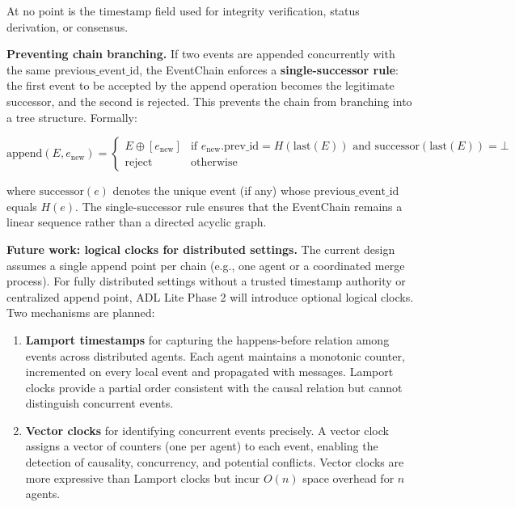 At no point is the \(\text{timestamp}\) field used for integrity verification, status derivation, or consensus.

\textbf{Preventing chain branching.} If two events are appended concurrently with the same \(\text{previous\_event\_id}\), the EventChain enforces a \textbf{single-successor rule}: the first event to be accepted by the append operation becomes the legitimate successor, and the second is rejected. This prevents the chain from branching into a tree structure. Formally:

\[
\text{append}(E, e_{\text{new}}) = \begin{cases}
E \oplus [e_{\text{new}}] & \text{if } e_{\text{new}}.\text{prev\_id} = H(\text{last}(E)) \text{ and } \text{successor}(\text{last}(E)) = \bot \\
\text{reject} & \text{otherwise}
\end{cases}
\]

where \(\text{successor}(e)\) denotes the unique event (if any) whose \(\text{previous\_event\_id}\) equals \(H(e)\). The single-successor rule ensures that the EventChain remains a linear sequence rather than a directed acyclic graph.

\textbf{Future work: logical clocks for distributed settings.} The current design assumes a single append point per chain (e.g., one agent or a coordinated merge process). For fully distributed settings without a trusted timestamp authority or centralized append point, ADL Lite Phase 2 will introduce optional logical clocks. Two mechanisms are planned:

\begin{enumerate}
\def\labelenumi{\arabic{enumi}.}
\item
  \textbf{Lamport timestamps} \cite{ref24} for capturing the happens-before relation among events across distributed agents. Each agent maintains a monotonic counter, incremented on every local event and propagated with messages. Lamport clocks provide a partial order consistent with the causal relation but cannot distinguish concurrent events.
\item
  \textbf{Vector clocks} \cite{ref25} for identifying concurrent events precisely. A vector clock assigns a vector of counters (one per agent) to each event, enabling the detection of causality, concurrency, and potential conflicts. Vector clocks are more expressive than Lamport clocks but incur \(O(n)\) space overhead for \(n\) agents.
\end{enumerate}

